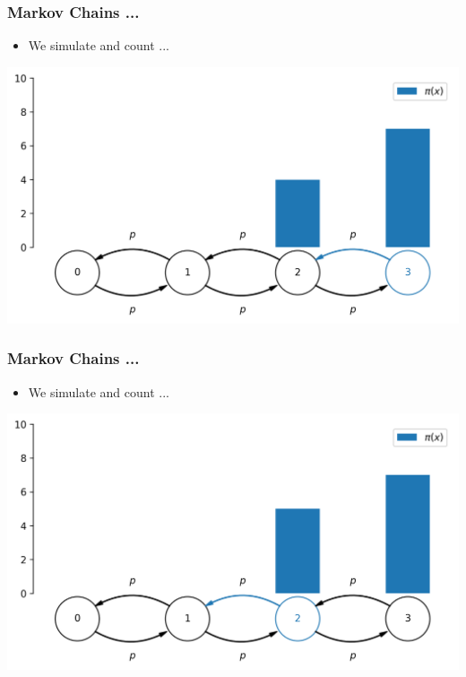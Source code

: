 \begin{frame}[c]
    \frametitle{Markov Chains ...}
    \begin{itemize}
        \item We simulate and count ...
    \end{itemize}
    \begin{center}
        \includegraphics[scale=0.6]{imgs/simulation10.png}
    \end{center}
\end{frame}

\begin{frame}[c]
    \frametitle{Markov Chains ...}
    \begin{itemize}
        \item We simulate and count ...
    \end{itemize}
    \begin{center}
        \includegraphics[scale=0.6]{imgs/simulation11.png}
    \end{center}
\end{frame}

